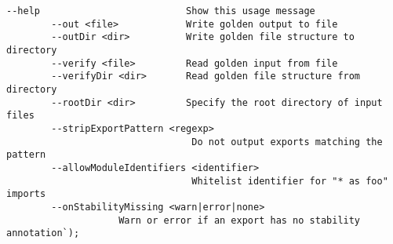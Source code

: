 \begin{verbatim}
--help                          Show this usage message
        --out <file>            Write golden output to file
        --outDir <dir>          Write golden file structure to directory
        --verify <file>         Read golden input from file
        --verifyDir <dir>       Read golden file structure from directory
        --rootDir <dir>         Specify the root directory of input files
        --stripExportPattern <regexp>
                                 Do not output exports matching the pattern
        --allowModuleIdentifiers <identifier>
                                 Whitelist identifier for "* as foo" imports
        --onStabilityMissing <warn|error|none>
                    Warn or error if an export has no stability annotation`);
\end{verbatim}
